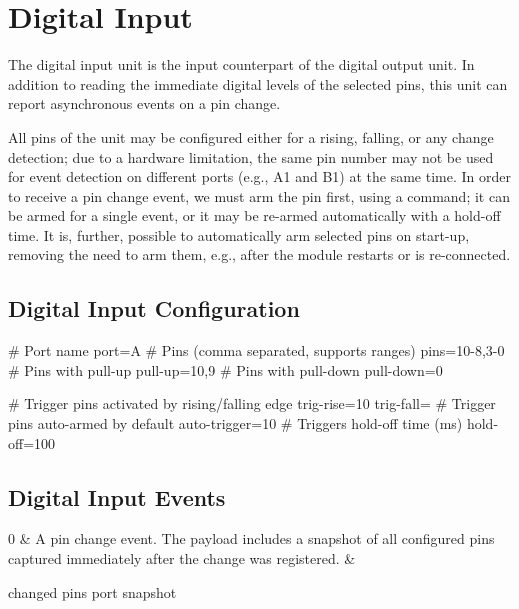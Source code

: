 \section{Digital Input}

The digital input unit is the input counterpart of the digital output unit. In addition to reading the immediate digital levels of the selected pins, this unit can report asynchronous events on a pin change. 

All pins of the unit may be configured either for a rising, falling, or any change detection; due to a hardware limitation, the same pin number may not be used for event detection on different ports (e.g., A1 and B1) at the same time. In order to receive a pin change event, we must arm the pin first, using a command; it can be armed for a single event, or it may be re-armed automatically with a hold-off time. It is, further, possible to automatically arm selected pins on start-up, removing the need to arm them, e.g., after the module restarts or is re-connected.

\subsection{Digital Input Configuration}

\begin{inicode}
[DI:in@2]
# Port name
port=A
# Pins (comma separated, supports ranges)
pins=10-8,3-0
# Pins with pull-up
pull-up=10,9
# Pins with pull-down
pull-down=0

# Trigger pins activated by rising/falling edge
trig-rise=10
trig-fall=
# Trigger pins auto-armed by default
auto-trigger=10
# Triggers hold-off time (ms)
hold-off=100
\end{inicode}

\subsection{Digital Input Events}

\begin{cmdlist}

	0 & 
	A pin change event. The payload includes a snapshot of all configured pins captured immediately after the change was registered.
	& \begin{cmdpld}
		 changed pins
		 port snapshot
	\end{cmdpld}

\end{cmdlist}

